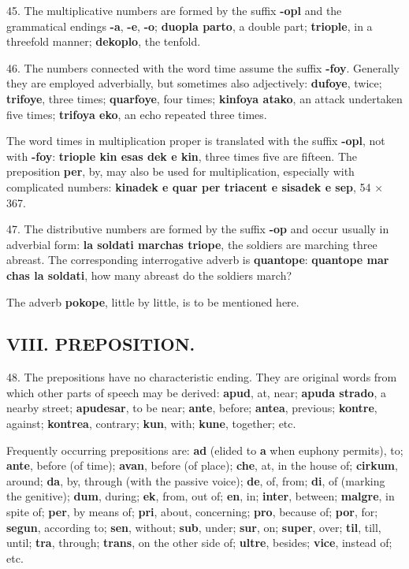 45. The multiplicative numbers are formed by the suffix \textbf{-opl} and the grammatical endings \textbf{-a}, \textbf{-e}, \textbf{-o}; \textbf{duopla parto}, a double part; \textbf{triople}, in a threefold manner; \textbf{dekoplo}, the tenfold. 

46. The numbers connected with the word time assume the suffix \textbf{-foy}. Generally they are employed adverbially, but sometimes also adjectively: \textbf{dufoye}, twice; \textbf{trifoye}, three times; \textbf{quarfoye}, four times; \textbf{kinfoya atako}, an attack undertaken five times; \textbf{trifoya eko}, an echo repeated three times. 

The word times in multiplication proper is translated with the suffix \textbf{-opl}, not with \textbf{-foy}: \textbf{triople kin esas dek e kin}, three times five are fifteen. The preposition \textbf{per}, by, may also be used for multiplication, especially with complicated numbers: \textbf{kinadek e quar per triacent e sisadek e sep}, 54 × 367. 

47. The distributive numbers are formed by the suffix \textbf{-op} and occur usually in adverbial form: \textbf{la soldati marchas triope}, the soldiers are marching three abreast. The corresponding interrogative adverb is \textbf{quantope}: \textbf{quantope mar chas la soldati}, how many abreast do the soldiers march? 

The adverb \textbf{pokope}, little by little, is to be mentioned here.

\subsection*{VIII. PREPOSITION.}
48. The prepositions have no characteristic ending. They are original words from which other parts of speech may be derived: \textbf{apud}, at, near; \textbf{apuda strado}, a nearby street; \textbf{apudesar}, to be near; \textbf{ante}, before; \textbf{antea}, previous; \textbf{kontre}, against; \textbf{kontrea}, contrary; \textbf{kun}, with; \textbf{kune}, together; etc. 

Frequently occurring prepositions are: \textbf{ad} (elided to \textbf{a} when euphony permits)\footnotemark[1], to; \textbf{ante}, before (of time); \textbf{avan}, before (of place); \textbf{che}, at, in the house of; \textbf{cirkum}, around; \textbf{da}, by, through (with the passive voice); \textbf{de}, of, from; \textbf{di}, of (marking the genitive); \textbf{dum}, during; \textbf{ek}, from, out of; \textbf{en}, in; \textbf{inter}, between; \textbf{malgre}, in spite of; \textbf{per}, by means of; \textbf{pri}, about, concerning; \textbf{pro}, because of; \textbf{por}, for; \textbf{segun}, according to; \textbf{sen}, without; \textbf{sub}, under; \textbf{sur}, on; \textbf{super}, over; \textbf{til}, till, until; \textbf{tra}, through; \textbf{trans}, on the other side of; \textbf{ultre}, besides; \textbf{vice}, instead of; etc. 

